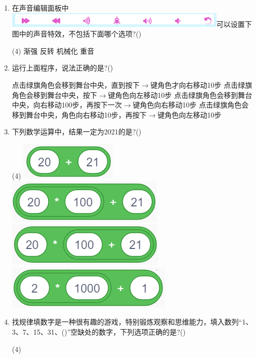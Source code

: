 \documentclass[10pt, a4paper]{article}
\begin{document}
\begin{enumerate}
        \item 在声音编辑面板中\includegraphics[width=.4\textwidth]{19.png}可以设置下图中的声音特效，不包括下面哪个选项?(\qquad)
        \begin{tasks}(4)
            \task 渐强
            \task 反转
            \task 机械化
            \task 重音
        \end{tasks}

        \item 运行上面程序，说法正确的是?(\qquad)
        \begin{tasks}
            \task 点击绿旗角色会移到舞台中央，直到按下$\to$键角色才向右移动10步
            \task 点击绿旗角色会移到舞台中央，按下$\to$键角色向左移动10步
            \task 点击绿旗角色会移到舞台中央，向右移动100步，再按下一次$\to$键角色向右移动10步
            \task 点击绿旗角色会移到舞台中央，角色向右移动10步，再按下$\to$键角色向左移动10步
        \end{tasks}

        \item 下列数学运算中，结果一定为2021的是?(\qquad)
        \begin{tasks}(4)
            \task \includegraphics[width=.12\textwidth]{21a.png}
            \task \includegraphics[width=.15\textwidth]{21b.png}
            \task \includegraphics[width=.15\textwidth]{21c.png}
            \task \includegraphics[width=.15\textwidth]{21d.png}
        \end{tasks}

        \item 找规律填数字是一种很有趣的游戏，特别锻炼观察和思维能力，填入数列“1、3、7、15、31、(\quad)”空缺处的数字，下列选项正确的是?(\qquad)
        \begin{tasks}(4)
        \end{tasks}


\end{enumerate}
\end{document}
